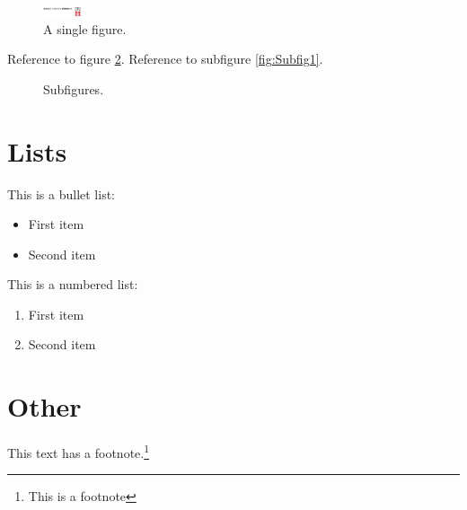 \begin{figure}[htbp]
 \centering
 \includegraphics[width=0.1\textwidth]{gfx/DTULogo}
 \caption{A single figure.}
 \label{fig:SingleFigure}
\end{figure}


Reference to figure \ref{fig:BigFigure}. Reference to subfigure \ref{fig:Subfig1}.
\begin{figure}[htbp]
 \centering
 \caption{Subfigures.}
 \label{fig:BigFigure}
\end{figure}



\section{Lists}

This is a bullet list:
\begin{itemize}
 \item First item
 \item Second item
\end{itemize}

This is a numbered list:
\begin{enumerate}
 \item First item
 \item Second item
\end{enumerate}


\section{Other}

This text has a footnote.\footnote{This is a footnote}

